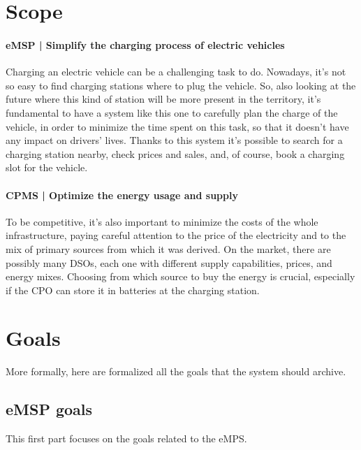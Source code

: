 \section{Scope}

\paragraph{eMSP | Simplify the charging process of electric vehicles} Charging an electric vehicle can be a challenging task to do. Nowadays, it's not so easy to find charging stations where to plug the vehicle. So, also looking at the future where this kind of station will be more present in the territory, it's fundamental to have a system like this one to carefully plan the charge of the vehicle, in order to minimize the time spent on this task, so that it doesn't have any impact on drivers' lives. Thanks to this system it's possible to search for a charging station nearby, check prices and sales, and, of course, book a charging slot for the vehicle.

\paragraph{CPMS | Optimize the energy usage and supply} To be competitive, it's also important to minimize the costs of the whole infrastructure, paying careful attention to the price of the electricity and to the mix of primary sources from which it was derived. On the market, there are possibly many DSOs, each one with different supply capabilities, prices, and energy mixes. Choosing from which source to buy the energy is crucial, especially if the CPO can store it in batteries at the charging station.

\pagebreak

\section{Goals}

More formally, here are formalized all the goals that the system should archive.

\subsection{eMSP goals}

This first part focuses on the goals related to the eMPS.

